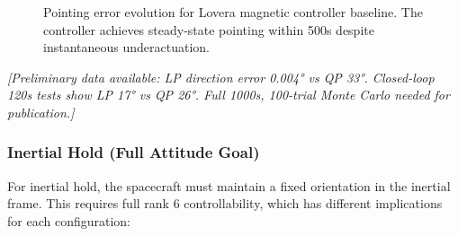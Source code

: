 \documentclass[conference]{IEEEtran}
\begin{document}
\begin{figure}[h]
    \centering
    \caption{Pointing error evolution for Lovera magnetic controller baseline. The controller achieves steady-state pointing within 500s despite instantaneous underactuation.}
    \label{fig:lovera_error}
\end{figure}

%

\emph{[Preliminary data available: LP direction error 0.004° vs QP 33°. Closed-loop 120s tests show LP 17° vs QP 26°. Full 1000s, 100-trial Monte Carlo needed for publication.]}

\subsubsection{Inertial Hold (Full Attitude Goal)}
For inertial hold, the spacecraft must maintain a fixed orientation in the inertial frame. This requires full rank 6 controllability, which has different implications for each configuration:
\end{document}
